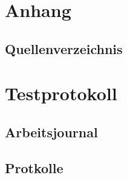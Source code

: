 \section{Anhang}
\clearpage
\renewcommand{\refname}{Literaturverzeichnis}
\subsection{Quellenverzeichnis}

\newpage


\section{Testprotokoll}


\subsection{Arbeitsjournal}
\label{app:Arbeitsjournal}


\subsection{Protkolle}
\label{app:Protokolle}






%
\clearpage



